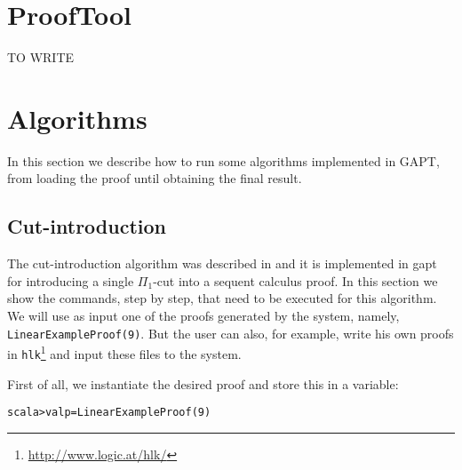 \documentclass[a4paper, 11pt]{report}
\begin{document}
\section{ProofTool}
\label{sec:prooftool}

TO WRITE

\section{Algorithms}

In this section we describe how to run some algorithms implemented in GAPT, from
loading the proof until obtaining the final result.

\subsection{Cut-introduction}

The cut-introduction algorithm was described in \cite{cutIntro2013} and it is
implemented in gapt for introducing a single $\Pi_1$-cut into a sequent calculus
proof. In this section we show the commands, step by step, that need to be
executed for this algorithm. We will use as input one of the proofs generated by
the system, namely, \texttt{LinearExampleProof(9)}. But the
user can also, for example, write his own proofs in
\texttt{hlk}\footnote{\url{http://www.logic.at/hlk/}} and input these files to
the system. 

First of all, we instantiate the desired proof and store this in a variable:
{\small
  \begin{alltt}
    scala> val p = LinearExampleProof(9) 
  \end{alltt}
}
\end{document}

